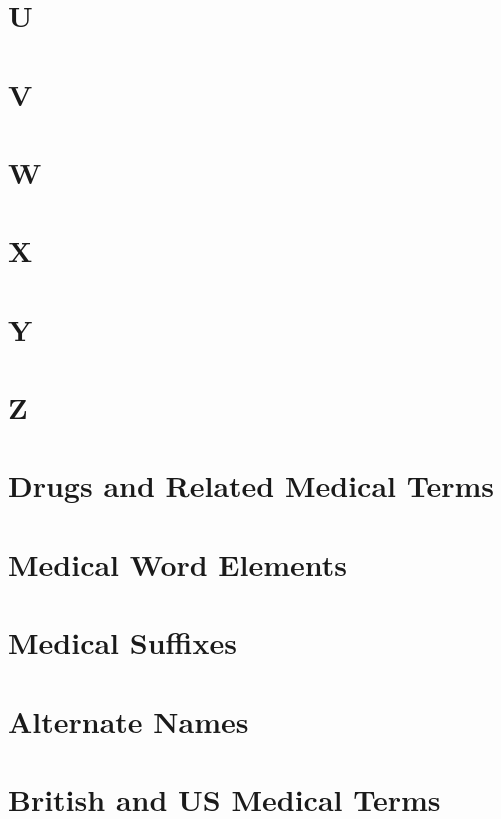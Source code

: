 \documentclass[11pt,twocolumn,twoside]{book}
\newcommand{\1}{\ifmmode\mathbin{\%}\else\%\fi}
\begin{document}
\chapter{U}

\chapter{V}

\chapter{W}

\chapter{X}

\chapter{Y}

\chapter{Z}


\chapter{Drugs and Related Medical Terms}


\clearpage
\onecolumn
\appendix
\chapter{Medical Word Elements}



\clearpage
\chapter{Medical Suffixes}



\clearpage
\chapter{Alternate Names}


\clearpage
\chapter{British and US Medical Terms}

\end{document}
